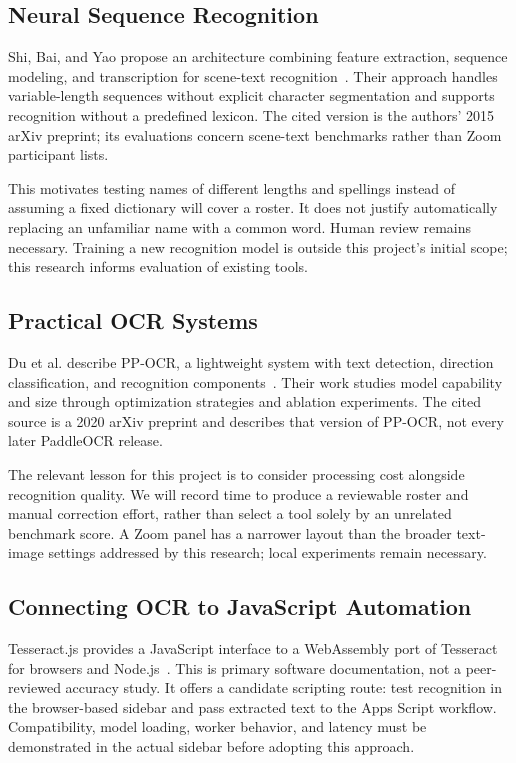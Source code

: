\subsection{Neural Sequence Recognition}
Shi, Bai, and Yao propose an architecture combining feature extraction, sequence
modeling, and transcription for scene-text recognition~\cite{shi2015crnn}.
Their approach handles variable-length sequences without explicit character
segmentation and supports recognition without a predefined lexicon. The cited
version is the authors' 2015 arXiv preprint; its evaluations concern scene-text
benchmarks rather than Zoom participant lists.

This motivates testing names of different lengths and spellings instead of
assuming a fixed dictionary will cover a roster. It does not justify automatically
replacing an unfamiliar name with a common word. Human review remains necessary.
Training a new recognition model is outside this project's initial scope; this
research informs evaluation of existing tools.

\subsection{Practical OCR Systems}
Du et al. describe PP-OCR, a lightweight system with text detection, direction
classification, and recognition components~\cite{du2020ppocr}. Their work studies
model capability and size through optimization strategies and ablation experiments.
The cited source is a 2020 arXiv preprint and describes that version of PP-OCR,
not every later PaddleOCR release.

The relevant lesson for this project is to consider processing cost alongside
recognition quality. We will record time to produce a reviewable roster and
manual correction effort, rather than select a tool solely by an unrelated
benchmark score. A Zoom panel has a narrower layout than the broader text-image
settings addressed by this research; local experiments remain necessary.

\subsection{Connecting OCR to JavaScript Automation}
Tesseract.js provides a JavaScript interface to a WebAssembly port of Tesseract
for browsers and Node.js~\cite{tesseractJs}. This is primary software documentation,
not a peer-reviewed accuracy study. It offers a candidate scripting route:
test recognition in the browser-based sidebar and pass extracted text to the
Apps Script workflow. Compatibility, model loading, worker behavior, and latency
must be demonstrated in the actual sidebar before adopting this approach.

